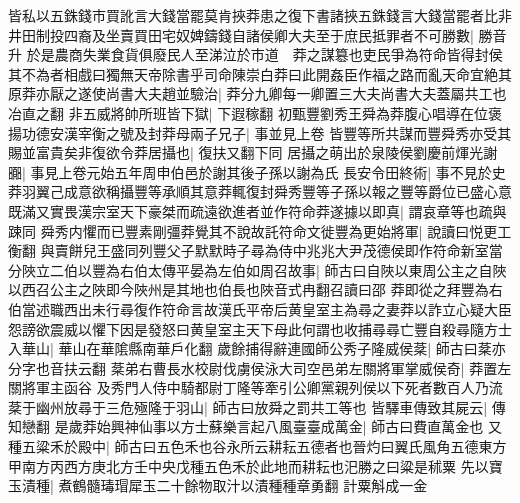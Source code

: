 皆私以五銖錢市買訛言大錢當罷莫肯挾莽患之復下書諸挾五銖錢言大錢當罷者比非井田制投四裔及坐賣買田宅奴婢鑄錢自諸侯卿大夫至于庶民抵罪者不可勝數|{
	勝音升}
於是農商失業食貨俱廢民人至涕泣於市道　莽之謀簒也吏民爭為符命皆得封侯其不為者相戲曰獨無天帝除書乎司命陳崇白莽曰此開姦臣作福之路而亂天命宜絶其原莽亦厭之遂使尚書大夫趙並驗治|{
	莽分九卿每一卿置三大夫尚書大夫蓋屬共工也冶直之翻}
非五威將帥所班皆下獄|{
	下遐稼翻}
初甄豐劉秀王舜為莽腹心唱導在位褒揚功德安漢宰衡之號及封莽母兩子兄子|{
	事並見上卷}
皆豐等所共謀而豐舜秀亦受其賜並富貴矣非復欲令莽居攝也|{
	復扶又翻下同}
居攝之萌出於泉陵侯劉慶前煇光謝嚻|{
	事見上卷元始五年周申伯邑於謝其後子孫以謝為氏}
長安令田終術|{
	事不見於史}
莽羽翼己成意欲稱攝豐等承順其意莽輒復封舜秀豐等子孫以報之豐等爵位已盛心意既滿又實畏漢宗室天下豪桀而疏遠欲進者並作符命莽遂據以即真|{
	謂哀章等也疏與踈同}
舜秀内懼而已豐素剛彊莽覺其不說故託符命文徙豐為更始將軍|{
	說讀曰悦更工衡翻}
與賣餅兒王盛同列豐父子默默時子尋為侍中兆兆大尹茂德侯即作符命新室當分陜立二伯以豐為右伯太傳平晏為左伯如周召故事|{
	師古曰自陜以東周公主之自陜以西召公主之陜即今陜州是其地也伯長也陜音式冉翻召讀曰邵}
莽即從之拜豐為右伯當述職西出未行尋復作符命言故漢氏平帝后黄皇室主為尋之妻莽以詐立心疑大臣怨謗欲震威以懼下因是發怒曰黄皇室主天下母此何謂也收捕尋尋亡豐自殺尋隨方士入華山|{
	華山在華隂縣南華戶化翻}
歲餘捕得辭連國師公秀子隆威侯棻|{
	師古曰棻亦分字也音扶云翻}
棻弟右曹長水校尉伐虜侯泳大司空邑弟左關將軍掌威侯奇|{
	莽置左關將軍主函谷}
及秀門人侍中騎都尉丁隆等牽引公卿黨親列侯以下死者數百人乃流棻于幽州放尋于三危殛隆于羽山|{
	師古曰放舜之罰共工等也}
皆驛車傳致其屍云|{
	傳知戀翻}
是歲莽始興神仙事以方士蘇樂言起八風臺臺成萬金|{
	師古曰費直萬金也}
又種五粱禾於殿中|{
	師古曰五色禾也谷永所云耕耘五德者也晉灼曰翼氏風角五德東方甲南方丙西方庚北方壬中央戊種五色禾於此地而耕耘也汜勝之曰粱是秫粟}
先以寶玉漬種|{
	煮鶴髓瑇瑁犀玉二十餘物取汁以漬種種章勇翻}
計粟斛成一金


